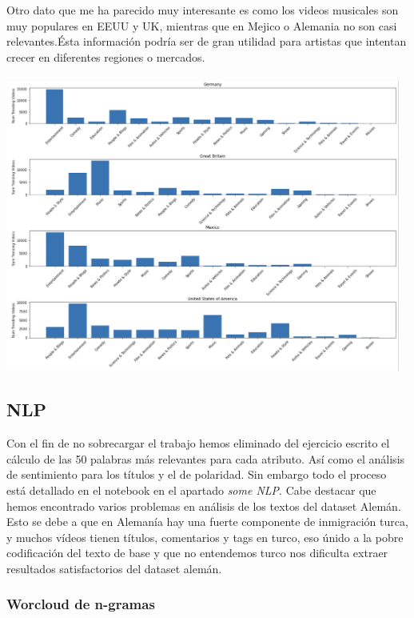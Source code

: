 \documentclass[a4paper,12pt]{article}
\begin{document}
\\
\\
Otro dato que me ha parecido muy interesante es como los videos musicales son muy populares en EEUU y UK, mientras que en Mejico o Alemania no son casi relevantes.\'Esta informaci\'on podr\'ia ser de gran utilidad para artistas que intentan crecer en diferentes regiones o mercados.
\\
\\
\includegraphics[width=13cm]{plot_categories.png}

\subsection{NLP}

Con el fin de no sobrecargar el trabajo hemos eliminado del ejercicio escrito el c\'alculo de las 50 palabras m\'as relevantes  para cada atributo. As\'i como el an\'alisis de sentimiento para los t\'itulos y el de polaridad. Sin embargo todo el proceso est\'a detallado en el notebook en el apartado {\itshape some NLP}. 
Cabe destacar que hemos encontrado varios problemas en an\'alisis de los textos del dataset Alem\'an. Esto se debe a que en Aleman\'ia hay una fuerte componente de inmigraci\'on turca, y muchos v\'ideos tienen t\'itulos, comentarios y tags en turco, eso \'unido a la pobre codificaci\'on del texto de base y que no entendemos turco nos dificulta extraer resultados satisfactorios del dataset alem\'an.

\subsubsection{Worcloud de n-gramas}
\end{document}
